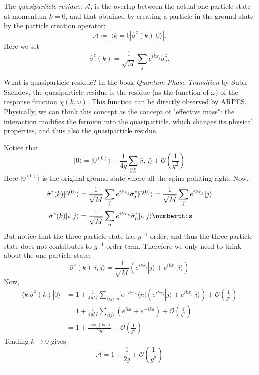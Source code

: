 The \textit{quasiparticle residue}, $\mathcal{A}$, is the overlap between the actual one-particle state at momentum $k=0$, and that obtained by creating a particle in the ground state by the particle creation operator:
\begin{equation}
\mathcal{A}\coloneqq \left|\langle k=0|\hat{\sigma}^z(k)|0\rangle\right|.
\end{equation}
Here we set
\begin{equation}
\hat{\sigma}^z(k)=\frac{1}{\sqrt{M}}\sum_j e^{ikx_j}\hat{\sigma}_j^z.
\end{equation}

What is quasiparticle residue? In the book \textit{Quantum Phase Transition} by Subir Sachdev, the quasiparticle residue is the residue (as the function of $\omega$) of the response function $\chi(k,\omega)$. This function can be directly observed by ARPES. Physically, we can think this concept as the concept of "effective mass": the interaction modifies the fermion into the quasiparticle, which changes its physical properties, and thus also the quasiparticle residue.

 Notice that
\begin{equation}
|0\rangle=|0^{(0)}\rangle + \frac{1}{4g}\sum_{\langle ij\rangle}|i,j\rangle+\mathcal{O}\left(\frac{1}{g^2}\right)
\end{equation}
Here $|0^{(0)}\rangle$ is the original ground state where all the spins pointing right. Now,
\begin{align*}
\hat{\sigma}^z(k)|0^{(0)}\rangle&=\frac{1}{\sqrt{M}}\sum_j e^{ikx_j}\hat{\sigma}_j^z|0^{(0)}\rangle = \frac{1}{\sqrt{M}}\sum_j e^{ikx_j}|j\rangle\\
\hat{\sigma}^z(k)|i,j\rangle&=\frac{1}{\sqrt{M}}\sum_{n}e^{ikx_n}\hat{\sigma}_n^z|i,j\rangle\numberthis
\end{align*}
But notice that the three-particle state has $g^{-1}$ order, and thus the three-particle state does not contributes to $g^{-1}$ order term. Therefore we only need to think about the one-particle state:
\begin{equation}
\hat{\sigma}^z(k)|i,j\rangle=\frac{1}{\sqrt{M}}\left(e^{ikx_i}|j\rangle+e^{ikx_j}|i\rangle\right)
\end{equation}
Now,
\begin{align*}
\langle k|\hat{\sigma}^z(k)|0\rangle&=1+\frac{1}{4gM}\sum_{\langle ij\rangle, n}e^{-ikx_n}\langle n|\left(e^{ikx_i}|j\rangle+e^{ikx_j}|i\rangle\right)+\mathcal{O}\left(\frac{1}{g^2}\right)\\
&=1+\frac{1}{4gM}\sum_{\langle ij\rangle}\left(e^{ika}+e^{-ika}\right)+\mathcal{O}\left(\frac{1}{g^2}\right)\\
&=1+\frac{\cos(ka)}{2g}+\mathcal{O}\left(\frac{1}{g^2}\right)
\end{align*}
Tending $k\rightarrow 0$ gives 
\begin{equation}
\mathcal{A}=1+\frac{1}{2g}+\mathcal{O}\left(\frac{1}{g^2}\right)
\end{equation}

\noindent\rule{\textwidth}{1pt}
\newline